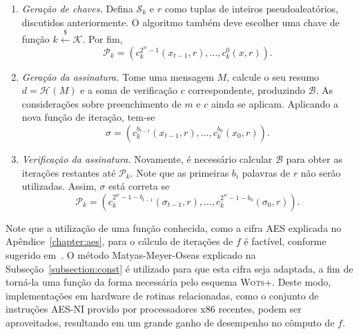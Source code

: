 \documentclass{ufsctex/ufsctex}
\newcommand{\pk}{\mathcal{P}_{k}}
\newcommand{\sk}{\mathcal{S}_{k}}
\newcommand{\hash}[2][]{\mathcal{H}^{#1} (#2)}
\newcommand{\random}{\stackrel{\$}{\longleftarrow}}
\newcommand{\wotsplus}{\textsc{Wots+}}
\begin{document}
\begin{enumerate}

  \item[] \emph{Geração de chaves.} Defina $\sk{}$ e $r$ como tuplas de
      inteiros pseudoaleatórios, discutidos anteriormente. O algoritmo também
        deve escolher uma chave de função $k \random{} \mathcal{K}$. Por fim,
        \begin{equation}
          \pk{} = (c^{2^{w}-1}_{k}(x_{t - 1}, r), \dots, c^{0}_{k}(x, r)).
        \end{equation}

  \item[] \emph{Geração da assinatura.} Tome uma mensagem $M$, calcule o seu
      resumo $d = \hash{M}$ e a soma de verificação $c$ correspondente,
        produzindo $\mathcal{B}$. As considerações sobre preenchimento de $m$ e
        $c$ ainda se aplicam. Aplicando a nova função de iteração, tem-se
        \begin{equation}
          \sigma = (c^{b_{t - 1}}_{k}(x_{t - 1}, r),
            \dots, c^{b_{0}}_{k}(x_{0}, r)).
        \end{equation}

  \item[] \emph{Verificação da assinatura.} Novamente, é necessário calcular
      $\mathcal{B}$ para obter as iterações restantes até $\pk{}$. Note que as
        primeiras $b_{i}$ palavras de $r$ não serão utilizadas. Assim, $\sigma$
        está correta se
        \begin{equation}
          \pk{} = (c^{2^{w} - 1 - b_{t - 1}}_{k}(\sigma_{t - 1}, r),
            \dots, c^{2^{w} - 1 - b_{0}}_{k}(\sigma_{0}, r)).
        \end{equation}

\end{enumerate}

Note que a utilização de uma função conhecida, como a cifra AES explicada no
Apêndice~\ref{chapter:aes}, para o cálculo de iterações de $f$ é factível,
conforme sugerido em~\cite[Subseção 4.1]{Huelsing:inproc:2013:jun}. O método
Matyas-Meyer-Oseas explicado na Subseção~\ref{subsection:const} é utilizado
para que esta cifra seja adaptada, a fim de torná-la uma função da forma
necessária pelo esquema \wotsplus{}. Deste modo, implementações em hardware de
rotinas relacionadas, como o conjunto de instruções
AES-NI provido por
processadores x86 recentes, podem ser aproveitados, resultando em um grande
ganho de desempenho no cômputo de $f$.
\end{document}
